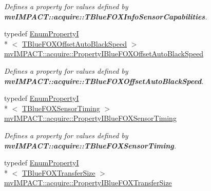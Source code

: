 \begin{DoxyCompactItemize}
\begin{DoxyCompactList}\small\item\em Defines a property for values defined by {\bfseries mv\+I\+M\+P\+A\+C\+T\+::acquire\+::\+T\+Blue\+F\+O\+X\+Info\+Sensor\+Capabilities}. \end{DoxyCompactList}\item 
\hypertarget{group___device_specific_interface_ga748b74d12ddf41831cc263b764026029}{typedef \hyperlink{classmv_i_m_p_a_c_t_1_1acquire_1_1_enum_property_i}{Enum\+Property\+I}\\*
$<$ \hyperlink{group___device_specific_interface_ga6858da05a066281204fc6a18c037da1c}{T\+Blue\+F\+O\+X\+Offset\+Auto\+Black\+Speed} $>$ \hyperlink{group___device_specific_interface_ga748b74d12ddf41831cc263b764026029}{mv\+I\+M\+P\+A\+C\+T\+::acquire\+::\+Property\+I\+Blue\+F\+O\+X\+Offset\+Auto\+Black\+Speed}}\label{group___device_specific_interface_ga748b74d12ddf41831cc263b764026029}

\begin{DoxyCompactList}\small\item\em Defines a property for values defined by {\bfseries mv\+I\+M\+P\+A\+C\+T\+::acquire\+::\+T\+Blue\+F\+O\+X\+Offset\+Auto\+Black\+Speed}. \end{DoxyCompactList}\item 
\hypertarget{group___device_specific_interface_ga45fd35a32780ef2617233fe593eb9c1f}{typedef \hyperlink{classmv_i_m_p_a_c_t_1_1acquire_1_1_enum_property_i}{Enum\+Property\+I}\\*
$<$ \hyperlink{group___device_specific_interface_gadd4b25a331e78a5cbe1478ba1e96fa4d}{T\+Blue\+F\+O\+X\+Sensor\+Timing} $>$ \hyperlink{group___device_specific_interface_ga45fd35a32780ef2617233fe593eb9c1f}{mv\+I\+M\+P\+A\+C\+T\+::acquire\+::\+Property\+I\+Blue\+F\+O\+X\+Sensor\+Timing}}\label{group___device_specific_interface_ga45fd35a32780ef2617233fe593eb9c1f}

\begin{DoxyCompactList}\small\item\em Defines a property for values defined by {\bfseries mv\+I\+M\+P\+A\+C\+T\+::acquire\+::\+T\+Blue\+F\+O\+X\+Sensor\+Timing}. \end{DoxyCompactList}\item 
\hypertarget{group___device_specific_interface_gaae90f3807daf211cdd7b687603d2f787}{typedef \hyperlink{classmv_i_m_p_a_c_t_1_1acquire_1_1_enum_property_i}{Enum\+Property\+I}\\*
$<$ \hyperlink{group___device_specific_interface_ga3d85571ec2d787bc90e363a8955eca11}{T\+Blue\+F\+O\+X\+Transfer\+Size} $>$ \hyperlink{group___device_specific_interface_gaae90f3807daf211cdd7b687603d2f787}{mv\+I\+M\+P\+A\+C\+T\+::acquire\+::\+Property\+I\+Blue\+F\+O\+X\+Transfer\+Size}}\label{group___device_specific_interface_gaae90f3807daf211cdd7b687603d2f787}


\end{DoxyCompactItemize}
